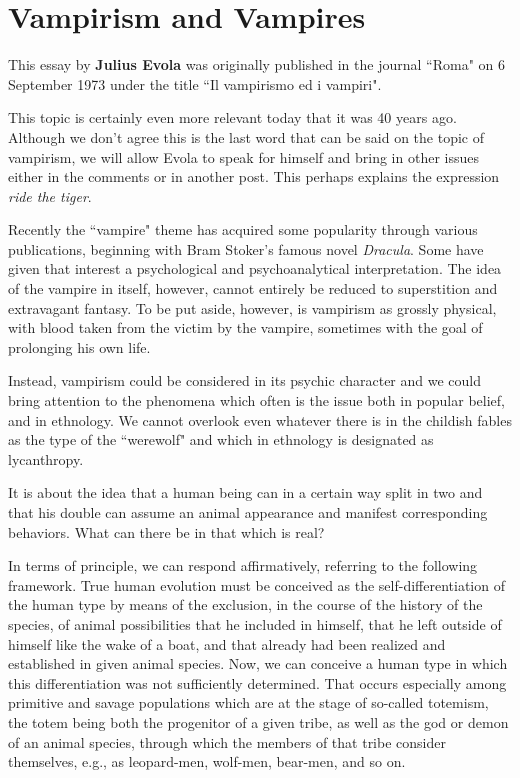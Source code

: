 \section{Vampirism and Vampires}

\begin{quotex}
This essay by \textbf{Julius Evola} was originally published in the journal ``Roma" on 6 September 1973 under the title ``Il vampirismo ed i vampiri".

This topic is certainly even more relevant today that it was 40 years ago. Although we don't agree this is the last word that can be said on the topic of vampirism, we will allow Evola to speak for himself and bring in other issues either in the comments or in another post. This perhaps explains the expression \emph{ride the tiger}. 
\end{quotex}

Recently the ``vampire" theme has acquired some popularity through various publications, beginning with Bram Stoker's famous novel \emph{Dracula}. Some have given that interest a psychological and psychoanalytical interpretation. The idea of the vampire in itself, however, cannot entirely be reduced to superstition and extravagant fantasy. To be put aside, however, is vampirism as grossly physical, with blood taken from the victim by the vampire, sometimes with the goal of prolonging his own life.

Instead, vampirism could be considered in its psychic character and we could bring attention to the phenomena which often is the issue both in popular belief, and in ethnology. We cannot overlook even whatever there is in the childish fables as the type of the ``werewolf" and which in ethnology is designated as lycanthropy.

It is about the idea that a human being can in a certain way split in two and that his double can assume an animal appearance and manifest corresponding behaviors. What can there be in that which is real?

In terms of principle, we can respond affirmatively, referring to the following framework. True human evolution must be conceived as the self-differentiation of the human type by means of the exclusion, in the course of the history of the species, of animal possibilities that he included in himself, that he left outside of himself like the wake of a boat, and that already had been realized and established in given animal species. Now, we can conceive a human type in which this differentiation was not sufficiently determined. That occurs especially among primitive and savage populations which are at the stage of so-called totemism, the totem being both the progenitor of a given tribe, as well as the god or demon of an animal species, through which the members of that tribe consider themselves, e.g., as leopard-men, wolf-men, bear-men, and so on.

